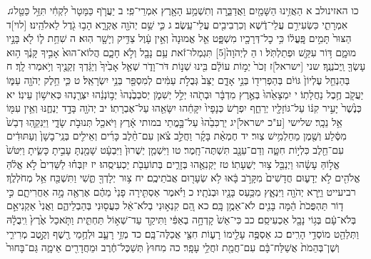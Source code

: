 \documentclass[twoside, openany, parskip=half, 11pt]{book}
\begin{document}
♫כו האזינולב א הַאֲזִ֥ינוּ הַשָּׁמַ֖יִם וַאֲדַבֵּ֑רָה 	וְתִשְׁמַ֥ע הָאָ֖רֶץ אִמְרֵי־פִֽי׃
ב יַעֲרֹ֤ף כַּמָּטָר֙ לִקְחִ֔י 	תִּזַּ֥ל כַּטַּ֖ל אִמְרָתִ֑י
כִּשְׂעִירִ֣ם עֲלֵי־דֶ֔שֶׁא 	וְכִרְבִיבִ֖ים עֲלֵי־עֵֽשֶׂב׃
ג כִּ֛י שֵׁ֥ם יְהֹוָ֖ה אֶקְרָ֑א 	הָב֥וּ גֹ֖דֶל לֵאלֹהֵֽינוּ׃
[לוי]ד הַצּוּר֙ תָּמִ֣ים פׇּֽעֳל֔וֹ 	כִּ֥י כׇל־דְּרָכָ֖יו מִשְׁפָּ֑ט
אֵ֤ל אֱמוּנָה֙ וְאֵ֣ין עָ֔וֶל 	צַדִּ֥יק וְיָשָׁ֖ר הֽוּא׃
ה שִׁחֵ֥ת ל֛וֹ לֹ֖א בָּנָ֣יו מוּמָ֑ם 	דּ֥וֹר עִקֵּ֖שׁ וּפְתַלְתֹּֽל׃
ו הַ לְיְהֹוָה֙‏[5] תִּגְמְלוּ־זֹ֔את 	עַ֥ם נָבָ֖ל וְלֹ֣א חָכָ֑ם
הֲלוֹא־הוּא֙ אָבִ֣יךָ קָּנֶ֔ךָ 	ה֥וּא עָשְׂךָ֖ וַֽיְכֹנְנֶֽךָ׃
שני [ישראל]ז זְכֹר֙ יְמ֣וֹת עוֹלָ֔ם בִּ֖ינוּ שְׁנ֣וֹת דֹּר־וָדֹ֑ר 	שְׁאַ֤ל אָבִ֙יךָ֙ וְיַגֵּ֔דְךָ זְקֵנֶ֖יךָ וְיֹ֥אמְרוּ לָֽךְ׃
ח בְּהַנְחֵ֤ל עֶלְיוֹן֙ גּוֹיִ֔ם 	בְּהַפְרִיד֖וֹ בְּנֵ֣י אָדָ֑ם
יַצֵּב֙ גְּבֻלֹ֣ת עַמִּ֔ים 	לְמִסְפַּ֖ר בְּנֵ֥י יִשְׂרָאֵֽל׃
ט כִּ֛י חֵ֥לֶק יְהֹוָ֖ה עַמּ֑וֹ 	יַעֲקֹ֖ב חֶ֥בֶל נַחֲלָתֽוֹ׃
י יִמְצָאֵ֙הוּ֙ בְּאֶ֣רֶץ מִדְבָּ֔ר 	וּבְתֹ֖הוּ יְלֵ֣ל יְשִׁמֹ֑ן
יְסֹבְבֶ֙נְהוּ֙ יְב֣וֹנְנֵ֔הוּ 	יִצְּרֶ֖נְהוּ כְּאִישׁ֥וֹן עֵינֽוֹ׃
יא כְּנֶ֙שֶׁר֙ יָעִ֣יר קִנּ֔וֹ עַל־גּוֹזָלָ֖יו יְרַחֵ֑ף 	יִפְרֹ֤שׂ כְּנָפָיו֙ יִקָּחֵ֔הוּ יִשָּׂאֵ֖הוּ עַל־אֶבְרָתֽוֹ׃
יב יְהֹוָ֖ה בָּדָ֣ד יַנְחֶ֑נּוּ 	וְאֵ֥ין עִמּ֖וֹ אֵ֥ל נֵכָֽר׃
שלישי [ע"כ ישראל]יג יַרְכִּבֵ֙הוּ֙ עַל־בָּ֣מֳתֵי במותי אָ֔רֶץ 	וַיֹּאכַ֖ל תְּנוּבֹ֣ת שָׂדָ֑י
וַיֵּנִקֵ֤הֽוּ דְבַשׁ֙ מִסֶּ֔לַע 	וְשֶׁ֖מֶן מֵחַלְמִ֥ישׁ צֽוּר׃
יד חֶמְאַ֨ת בָּקָ֜ר וַחֲלֵ֣ב צֹ֗אן 	עִם־חֵ֨לֶב כָּרִ֜ים וְאֵילִ֤ים
בְּנֵֽי־בָשָׁן֙ וְעַתּוּדִ֔ים 	עִם־חֵ֖לֶב כִּלְי֣וֹת חִטָּ֑ה
וְדַם־עֵנָ֖ב תִּשְׁתֶּה־חָֽמֶר׃ 	טו וַיִּשְׁמַ֤ן יְשֻׁרוּן֙ וַיִּבְעָ֔ט
שָׁמַ֖נְתָּ עָבִ֣יתָ כָּשִׂ֑יתָ 	וַיִּטֹּשׁ֙ אֱל֣וֹהַּ עָשָׂ֔הוּ
וַיְנַבֵּ֖ל צ֥וּר יְשֻׁעָתֽוֹ׃ 	טז יַקְנִאֻ֖הוּ בְּזָרִ֑ים
בְּתוֹעֵבֹ֖ת יַכְעִיסֻֽהוּ׃ 	יז יִזְבְּח֗וּ לַשֵּׁדִים֙ לֹ֣א אֱלֹ֔הַּ
אֱלֹהִ֖ים לֹ֣א יְדָע֑וּם 	חֲדָשִׁים֙ מִקָּרֹ֣ב בָּ֔אוּ
לֹ֥א שְׂעָר֖וּם אֲבֹתֵיכֶֽם׃ 	יח צ֥וּר יְלָדְךָ֖ תֶּ֑שִׁי
וַתִּשְׁכַּ֖ח אֵ֥ל מְחֹלְלֶֽךָ׃ 	רביעייט וַיַּ֥רְא יְהֹוָ֖ה וַיִּנְאָ֑ץ
מִכַּ֥עַס בָּנָ֖יו וּבְנֹתָֽיו׃ 	כ וַיֹּ֗אמֶר אַסְתִּ֤ירָה פָנַי֙ מֵהֶ֔ם
אֶרְאֶ֖ה מָ֣ה אַחֲרִיתָ֑ם 	כִּ֣י ד֤וֹר תַּהְפֻּכֹת֙ הֵ֔מָּה
בָּנִ֖ים לֹא־אֵמֻ֥ן בָּֽם׃ 	כא הֵ֚ם קִנְא֣וּנִי בְלֹא־אֵ֔ל
כִּעֲס֖וּנִי בְּהַבְלֵיהֶ֑ם 	וַאֲנִי֙ אַקְנִיאֵ֣ם בְּלֹא־עָ֔ם
בְּג֥וֹי נָבָ֖ל אַכְעִיסֵֽם׃ 	כב כִּי־אֵשׁ֙ קָדְחָ֣ה בְאַפִּ֔י
וַתִּיקַ֖ד עַד־שְׁא֣וֹל תַּחְתִּ֑ית 	וַתֹּ֤אכַל אֶ֙רֶץ֙ וִֽיבֻלָ֔הּ
וַתְּלַהֵ֖ט מוֹסְדֵ֥י הָרִֽים׃ 	כג אַסְפֶּ֥ה עָלֵ֖ימוֹ רָע֑וֹת
חִצַּ֖י אֲכַלֶּה־בָּֽם׃ 	כד מְזֵ֥י רָעָ֛ב וּלְחֻ֥מֵי רֶ֖שֶׁף
וְקֶ֣טֶב מְרִירִ֑י 	וְשֶׁן־בְּהֵמֹת֙ אֲשַׁלַּח־בָּ֔ם
עִם־חֲמַ֖ת זֹחֲלֵ֥י עָפָֽר׃ 	כה מִחוּץ֙ תְּשַׁכֶּל־חֶ֔רֶב וּמֵחֲדָרִ֖ים אֵימָ֑ה גַּם־בָּחוּר֙
\end{document}
